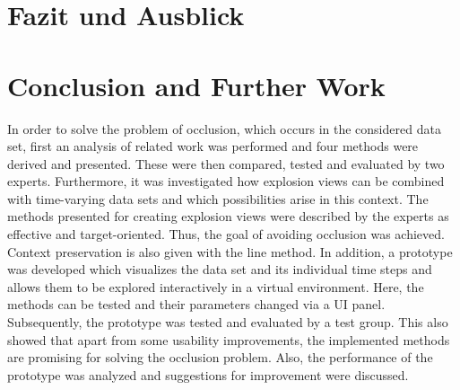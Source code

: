{\chapter{Fazit und Ausblick}}
{\chapter{Conclusion and Further Work}}

\label{sec:conclusion}

In order to solve the problem of occlusion, which occurs in the considered data set, first an analysis of related work was performed and four methods were derived and presented. These were then compared, tested and evaluated by two experts. Furthermore, it was investigated how explosion views can be combined with time-varying data sets and which possibilities arise in this context. The methods presented for creating explosion views were described by the experts as effective and target-oriented. Thus, the goal of avoiding occlusion was achieved. Context preservation is also given with the line method. In addition, a prototype was developed which visualizes the data set and its individual time steps and allows them to be explored interactively in a virtual environment. Here, the methods can be tested and their parameters changed via a UI panel. Subsequently, the prototype was tested and evaluated by a test group. This also showed that apart from some usability improvements, the implemented methods are promising for solving the occlusion problem. Also, the performance of the prototype was analyzed and suggestions for improvement were discussed.

